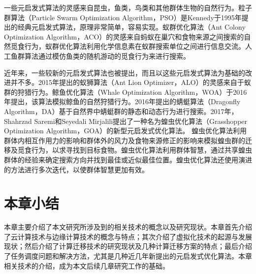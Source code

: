 一些元启发式算法的灵感来自昆虫，鱼类，鸟类和其他群体生物的自然行为。粒子群算法（Particle Swarm Optimization Algorithm，PSO）是Kennedy于1995年提出的经典元启发式算法，原理非常简单，容易实现\cite{kennedy1995particle,liao2007discrete,krishnasamy2013task}。蚁群优化算法（Ant Colony Optimization Algorithm，ACO）的灵感来自蚂蚁在巢穴和食物来源之间搜索的自然觅食行为，蚁群优化算法利用化学信息素在蚁群搜索单位之间进行信息交流\cite{dorigo1997ant,dorigo1999ant,Hao2018Network}。人工鱼群算法通过模仿鱼类的随机游动的觅食行为来进行搜索\cite{桓自强2014aafsa}。

近年来，一些较新的元启发式算法也被提出，而且以这些元启发式算法为基础的改进并不多。2015年提出的蚁狮算法（Ant Lion Optimizer，ALO）的灵感来自于蚁群的狩猎行为\cite{mirjalili2015ant}。鲸鱼优化算法（Whale Optimization Algorithm，WOA）于2016年提出，该算法模拟鲸鱼的自然狩猎行为\cite{mirjalili2016whale}。2016年提出的蜻蜓算法（Dragonfly Algorithm，DA）基于自然界中蜻蜓群的静态和动态行为进行搜索\cite{mirjalili2016dragonfly}。2017年，Shahrzad Saremi和Seyedali Mirjalili提出了一种名为蝗虫优化算法（Grasshopper Optimization Algorithm，GOA）的新型元启发式优化算法。 蝗虫优化算法利用群体内相互作用力的影响和群体外的风力及食物来源修正的影响来模拟蝗虫群的迁移及觅食行为，以求寻找到目标食物\cite{saremi2017grasshopper}。蝗虫优化算法利用群体智慧，通过共享蝗虫群体的经验来确定搜索方向并找到最佳或近似最佳位置。蝗虫优化算法还使用演进的方法进行多次迭代，以使群体智慧更加有效。

\section{本章小结}\label{sec:related_work_summary}

本章主要介绍了本文研究所涉及到的相关技术的概念以及研究现状。本章首先介绍了云计算技术与边缘计算技术的概念与特点；其次介绍了虚拟化技术的起源与发展现状；然后介绍了计算迁移技术的研究现状及几种计算迁移方案的特点；最后介绍了任务调度问题和解决方法，尤其是几种近几年新提出的元启发式优化算法。本章相关技术的介绍，成为本文后续几章研究工作的基础。